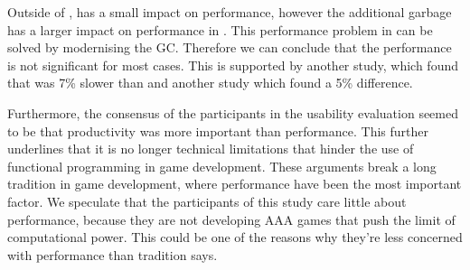Outside of \unity, \fs has a small impact on performance, however the additional garbage has a larger impact on performance in \unity. This performance problem in \unity can be solved by modernising the \gls{GC}. Therefore we can conclude that the performance is not significant for most cases. This is supported by another study, which found that \fs was 7\% slower than \cs\cite{bolhuis2019gameplay} and another study which found a 5\% difference\cite{maggiore2012formal}.

Furthermore, the consensus of the participants in the usability evaluation seemed to be that productivity was more important than performance. This further underlines that it is no longer technical limitations that hinder the use of functional programming in game development. These arguments break a long tradition in game development, where performance have been the most important factor. We speculate that the participants of this study care little about performance, because they are not developing AAA games that push the limit of computational power. This could be one of the reasons why they're less concerned with performance than tradition says.
